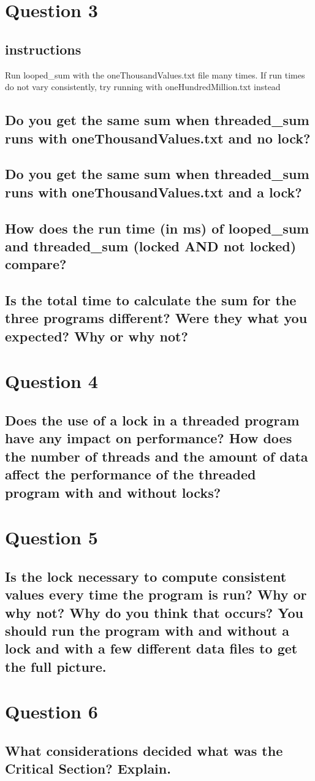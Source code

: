 \documentclass{assignment-x}
\begin{document}
\section{Question 3}
\subsection{instructions}
Run looped\_sum with the oneThousandValues.txt file many times. If run times do not vary consistently, try running with oneHundredMillion.txt instead
\subsection{Do you get the same sum when threaded\_sum runs with oneThousandValues.txt and no lock?}
\subsection{Do you get the same sum when threaded\_sum runs with oneThousandValues.txt and a lock?}
\subsection{How does the run time (in ms) of looped\_sum and threaded\_sum (locked AND not locked) compare?}
\subsection{Is the total time to calculate the sum for the three programs different? Were they what you expected? Why or why not?}

\section{Question 4}
\subsection{Does the use of a lock in a threaded program have any impact on performance? How does the number of threads and the amount of data affect the performance of the threaded program with and without locks?}
\section{Question 5}
\subsection{Is the lock necessary to compute consistent values every time the program is run? Why or why not? Why do you think that occurs? You should run the program with and without a lock and with a few different data files to get the full picture.}
\section{Question 6}
\subsection{What considerations decided what was the Critical Section? Explain.}
\end{document}
